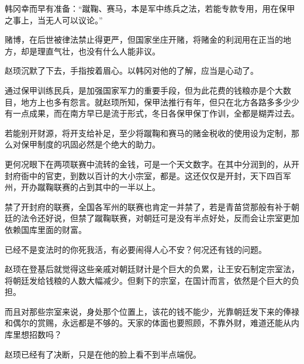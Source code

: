 韩冈幸而早有准备：“蹴鞠、赛马，本是军中练兵之法，若能专款专用，用在保甲之事上，当无人可以议论。”

赌博，在后世被律法禁止得更严，但国家坐庄开赌，将赌金的利润用在正当的地方，却是理直气壮，也没有什么人能非议。

赵顼沉默了下去，手指按着眉心。以韩冈对他的了解，应当是心动了。

通过保甲训练民兵，是加强国家军力的重要手段，但为此花费的钱粮亦是个大数目，地方上也多有怨言。就赵顼所知，保甲法推行有年，但只在北方各路多多少少有一点成果，而在南方早已是流于形式，冬日各保甲保丁作训，全都是糊弄过去。

若能别开财源，将开支给补足，至少将蹴鞠和赛马的赌金税收的使用设为定制，那么对保甲制度的巩固必然是个绝大的助力。

更何况眼下在两项联赛中流转的金钱，可是一个天文数字。在其中分润到的，从开封府衙中的官吏，到数以百计的大小宗室，都是。这还仅仅是开封，天下四百军州，开办蹴鞠联赛的占到其中的一半以上。

禁了开封府的联赛，全国各军州的联赛也肯定一并禁了，若是青苗贷那般有补于朝廷的法令还好说，但禁了蹴鞠联赛，对朝廷可是没有半点好处，反而会让宗室更加依赖国库里面的财富。

已经不是变法时的你死我活，有必要闹得人心不安？何况还有钱的问题。

赵顼在登基后就觉得这些亲戚对朝廷财计是个巨大的负累，让王安石制定宗室法，将朝廷发给钱粮的人数大幅减少。但剩下的宗室，在国计而言，依然是个巨大的负担。

而且对那些宗室来说，身处那个位置上，该花的钱不能少，光靠朝廷发下来的俸禄和偶尔的赏赐，永远都是不够的。天家的体面也要照顾，不靠外财，难道还能从内库里想招数吗？

赵顼已经有了决断，只是在他的脸上看不到半点端倪。
